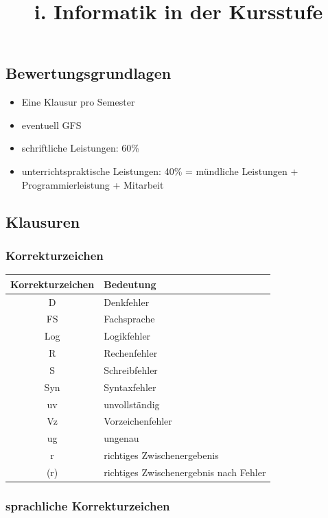 \documentclass[
  11pt,
  a4paper,
  DIV=11,
  numbers=noendperiod]{scrartcl}
\title{i. Informatik in der Kursstufe}
\author{}
\date{}
\providecommand{\tightlist}{%
  \setlength{\itemsep}{0pt}\setlength{\parskip}{0pt}}\usepackage{longtable,booktabs,array}
\begin{document}
\maketitle


\subsection{Bewertungsgrundlagen}\label{bewertungsgrundlagen}

\begin{itemize}
\tightlist
\item
  Eine Klausur pro Semester
\item
  eventuell GFS
\item
  schriftliche Leistungen: 60\%
\item
  unterrichtspraktische Leistungen: 40\% = mündliche Leistungen +
  Programmierleistung + Mitarbeit
\end{itemize}

\subsection{Klausuren}\label{klausuren}

\subsubsection{Korrekturzeichen}\label{korrekturzeichen}

\begin{longtable}[]{@{}cl@{}}
\toprule\noalign{}
Korrekturzeichen & Bedeutung \\
\midrule\noalign{}
\endhead
\bottomrule\noalign{}
\endlastfoot
D & Denkfehler \\
FS & Fachsprache \\
Log & Logikfehler \\
R & Rechenfehler \\
S & Schreibfehler \\
Syn & Syntaxfehler \\
uv & unvollständig \\
Vz & Vorzeichenfehler \\
ug & ungenau \\
r & richtiges Zwischenergebenis \\
(r) & richtiges Zwischenergebnis nach Fehler \\
\end{longtable}

\subsubsection{sprachliche
Korrekturzeichen}\label{sprachliche-korrekturzeichen}
\end{document}
